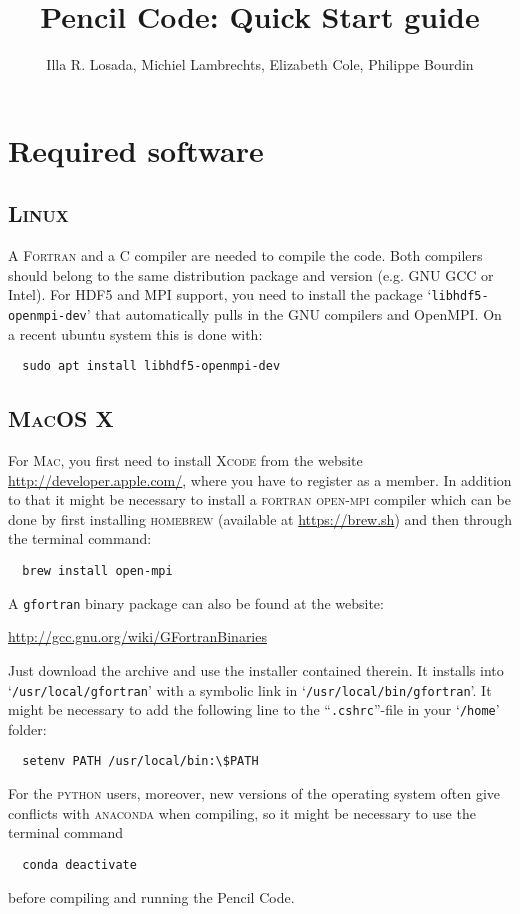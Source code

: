 \documentclass[a4paper,12pt]{article}
\title{Pencil Code: Quick Start guide}
\author{Illa R. Losada, Michiel Lambrechts, Elizabeth Cole, Philippe Bourdin}
\newcommand{\command}[1]{\texttt{#1}}
\newcommand{\file}[1]{``\texttt{#1}''}
\newcommand{\directory}[1]{`\texttt{#1}'}
\newcommand{\name}[1]{\textsc{#1}}
\begin{document}
\maketitle

\tableofcontents

\newpage


\section{Required software}

\subsection{\name{Linux}}
A \name{Fortran} and a \name{C} compiler are needed to compile the code.
Both compilers should belong to the same distribution package and version (e.g. GNU GCC or Intel).
For HDF5 and MPI support, you need to install the package \directory{libhdf5-openmpi-dev} that automatically pulls in the GNU compilers and OpenMPI. On a recent ubuntu system this is done with:
\begin{verbatim}
  sudo apt install libhdf5-openmpi-dev
\end{verbatim}

\subsection{\name{MacOS X}}
For \name{Mac}, you first need to install \name{Xcode} from the
website \url{http://developer.apple.com/}, where you have to register as a member.
In addition to that it might be necessary to install a \name{fortran} \name{open-mpi} compiler which can be done by first installing \name{homebrew} (available at \url{https://brew.sh}) and then through the terminal command:
\begin{verbatim}
  brew install open-mpi
\end{verbatim}
A \command{gfortran} binary package can also be found at the website:

\url{http://gcc.gnu.org/wiki/GFortranBinaries}

Just download the archive and use the installer contained therein.
It installs into \directory{/usr/local/gfortran} with
a symbolic link in \directory{/usr/local/bin/gfortran}. It might be necessary to add
the following line to the \file{.cshrc}-file in your \directory{/home} folder:
\begin{verbatim}
  setenv PATH /usr/local/bin:\$PATH
\end{verbatim} 
For the \name{python} users, moreover, new versions of the operating system often give conflicts with \name{anaconda} when compiling, so it might be necessary to use the terminal command 
\begin{verbatim}
  conda deactivate
\end{verbatim}
before compiling and running the Pencil Code.
\end{document}
